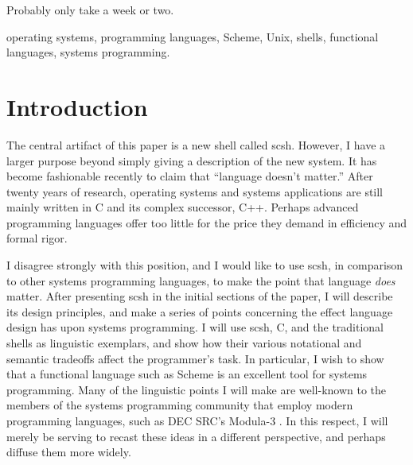 Probably only take a week or two.

{
\clearpage
\vspace*{\fill}

\newcommand{\keywords}[1]%
    {\newlength{\kwlength}\settowidth{\kwlength}{\bf Keywords: }%
     \setlength{\kwlength}{-\kwlength}\addtolength{\kwlength}{\linewidth}%
     \parbox[t]{\kwlength}{\raggedright{}#1.}}


\keywords{operating systems, programming languages, Scheme,
          Unix, shells, functional languages, systems programming}
}

\cleardoublepage
\tableofcontents
\cleardoublepage
\setcounter{page}{1}
\pagestyle{plain}

\section{Introduction}
The central artifact of this paper is a new {\Unix} shell called scsh.
However, I have a larger purpose beyond simply giving a description of
the new system.
It has become fashionable recently to claim that ``language doesn't matter.''
After twenty years of research, operating systems and systems
applications are still mainly written in C and its complex successor, C++.
Perhaps advanced programming languages offer too little for the price they
demand in efficiency and formal rigor.

I disagree strongly with this position, and
I would like to use scsh, in comparison to other {\Unix} systems programming
languages, to make the point that language {\em does\/} matter.
After presenting scsh in the initial sections of the paper,
I will describe its design principles, 
and make a series of points concerning the effect language design has
upon systems programming.
I will use scsh, C, and the traditional shells as linguistic exemplars,
and show how their various notational and semantic tradeoffs affect
the programmer's task.
In particular, I wish to show that a functional language such as Scheme is an
excellent tool for systems programming.
Many of the linguistic points I will make are well-known to the members of
the systems programming community that employ modern programming
languages, such as DEC SRC's Modula-3 \cite{Nelson}.
In this respect, I will merely be serving to recast these ideas in
a different perspective, and perhaps diffuse them more widely.

